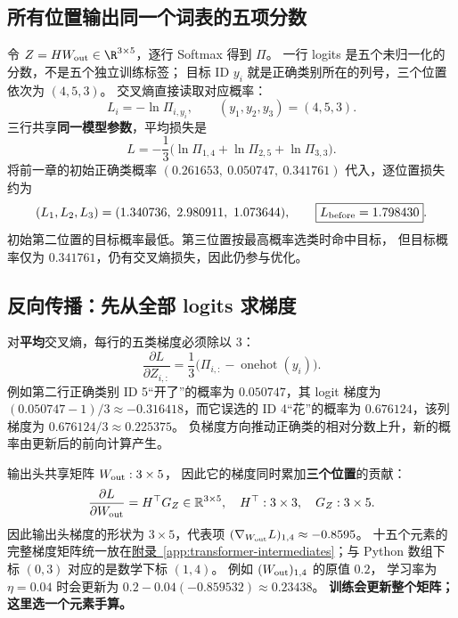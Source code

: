 \subsection{所有位置输出同一个词表的五项分数}

令 $Z=HW_{\rm out}\in\R^{3\times5}$，逐行 Softmax 得到 $\Pi$。
一行 logits 是五个未归一化的分数，不是五个独立训练标签；
目标 ID $y_i$ 就是正确类别所在的列号，三个位置依次为 $(4,5,3)$。
交叉熵直接读取对应概率：
\[
L_i=-\ln\Pi_{i,y_i},\qquad(y_1,y_2,y_3)=(4,5,3).
\]
三行共享\textbf{同一模型参数}，平均损失是
\begin{equation}
\boxed{L=-\frac13
\bigl(\ln\Pi_{1,4}+
      \ln\Pi_{2,5}+
      \ln\Pi_{3,3}\bigr).}
\label{eq:three-position-joint-loss}
\end{equation}
将前一章的初始正确类概率 $(0.261653,\ 0.050747,\ 0.341761)$
代入，逐位置损失约为
\[
(L_1,L_2,L_3)=(1.340736,\ 2.980911,\ 1.073644),
\qquad
\boxed{L_{\rm before}=1.798430}.
\]
初始第二位置的目标概率最低。第三位置按最高概率选类时命中目标，
但目标概率仅为 $0.341761$，仍有交叉熵损失，因此仍参与优化。

\subsection{反向传播：先从全部 logits 求梯度}
\label{sec:transformer-gradient-step}

对\textbf{平均}交叉熵，每行的五类梯度必须除以 $3$：
\begin{equation}
\boxed{\frac{\partial L}{\partial Z_{i,:}}
=\frac13\bigl(\Pi_{i,:}
-\operatorname{onehot}(y_i)\bigr).}
\label{eq:three-position-logit-grad}
\end{equation}
例如第二行正确类别 ID 5“开了”的概率为 $0.050747$，其 logit 梯度为
$(0.050747-1)/3\approx-0.316418$，而它误选的
ID 4“花”的概率为 $0.676124$，该列梯度为 $0.676124/3\approx0.225375$。
负梯度方向推动正确类的相对分数上升，新的概率由更新后的前向计算产生。

输出头共享矩阵 $W_{\rm out}:3\times5$，
因此它的梯度同时累加\textbf{三个位置}的贡献：
\[
\frac{\partial L}{\partial W_{\rm out}}=H^\top G_Z
\in\mathbb R^{3\times5},\quad
H^\top:3\times3,\quad G_Z:3\times5.
\]
因此输出头梯度的形状为 $3\times5$，代表项
$(\nabla_{W_{\rm out}}L)_{1,4}\approx-0.8595$。
十五个元素的完整梯度矩阵统一放在\hyperref[app:transformer-intermediates]{附录~\ref*{app:transformer-intermediates}}；与 Python 数组下标 $(0,3)$ 对应的是数学下标 $(1,4)$。
例如 $(W_{\rm out})_{1,4}$ 的原值 $0.2$，
学习率为 $\eta=0.04$ 时会更新为
$0.2-0.04(-0.859532)\approx0.23438$。
\textbf{训练会更新整个矩阵；这里选一个元素手算。}\label{route:joint-core-end}

